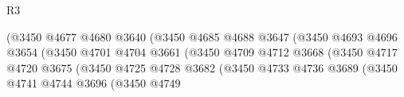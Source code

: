 \begin{lexlean}{R3}
\begin{coremodule}
                                                      (@3450
                                                        @4677
                                                        @4680
                                                        @3640
                                                        (@3450
                                                          @4685
                                                          @4688
                                                          @3647
                                                          (@3450
                                                            @4693
                                                            @4696
                                                            @3654
                                                            (@3450
                                                              @4701
                                                              @4704
                                                              @3661
                                                              (@3450
                                                                @4709
                                                                @4712
                                                                @3668
                                                                (@3450
                                                                  @4717
                                                                  @4720
                                                                  @3675
                                                                  (@3450
                                                                    @4725
                                                                    @4728
                                                                    @3682
                                                                    (@3450
                                                                      @4733
                                                                      @4736
                                                                      @3689
                                                                      (@3450
                                                                        @4741
                                                                        @4744
                                                                        @3696
                                                                        (@3450
                                                                          @4749

\end{coremodule}
\end{lexlean}
